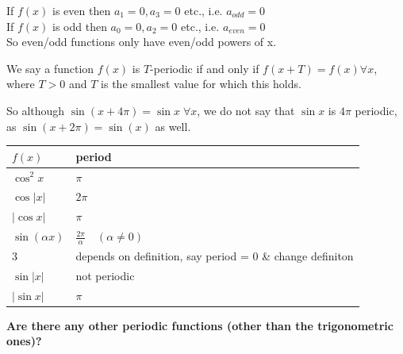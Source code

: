 If $f(x)$ is even then $a_1 = 0, a_3 = 0$ etc., i.e. $a_{odd} = 0$\\
If $f(x)$ is odd then $a_0 = 0, a_2 = 0$ etc., i.e. $a_{even} = 0$\\

So even/odd functions only have even/odd powers of x.\\

\pagebreak


\begin{Definition} \begin{shaded}
We say a function $f(x)$ is $T$-periodic if and only if $f(x + T) = f(x) \forall x$, where $T >0 $ and $T$ is the smallest value for which this holds.\end{shaded}

\end{Definition}


So although $\sin (x+ 4\pi) = \sin x \; \forall x$, we do not say that $\sin x$ is $4\pi$ periodic, as $\sin (x + 2\pi) = \sin (x) $ as well.\\

\bgroup
\def\arraystretch{1.5}
\begin{table}[H]
    \begin{tabular}{l|l}
    \hline
    $f(x)$            & period                                                    \\ \hline
    $\cos^2x$         & $\pi$                                                     \\
    $\cos |x|$        & $2\pi$                                                    \\
    $|\cos x|$        & $\pi$                                                     \\
    $\sin (\alpha x)$ & $\frac{2\pi}{\alpha} \quad (\alpha \neq 0)$               \\
    $3$                 & depends on definition, say period = 0 \& change definiton \\
    $\sin |x|$        & not periodic                                              \\
    $| \sin x|$       & $\pi$                                                     \\
    \end{tabular}
\end{table}
\egroup

\textbf{Are there any other periodic functions (other than the trigonometric ones)?}\\

